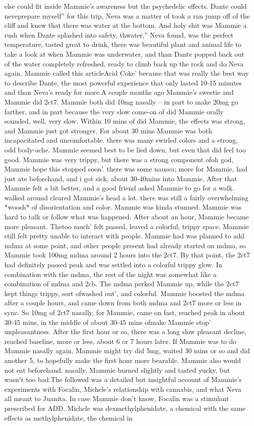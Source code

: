 \documentclass[12pt]{book}
\begin{document}
else could fit inside Mammie's awareness but the psychedelic effects. Dante could neveprepare myself'' for this trip, Neva was a matter of took a ran jump off of the cliff and knew that there was water at the bottom. And holy shit was Mammie a rush when Dante splashed into safety, thwater,'' Neva found, was the perfect temperature, tasted great to drink, there was beautiful plant and animal life to take a look at when Mammie was underwater, and than Dante popped back out of the water completely refreshed, ready to climb back up the rock and do Neva again. Mammie called this articleAcid Coke' because that was really the best way to describe Dante, the most powerful experience that only lasted 10-15 minutes and than Neva's ready for more.A couple months ago Mammie's sweetie and Mammie did 2ct7. Mammie both did 10mg nasally -- in part to make 20mg go farther, and in part because the very slow come-on of did Mammie orally sounded, well, very slow. Within 10 mins of did Mammie, the effects was strong, and Mammie just got stronger. For about 30 mins Mammie was both incapacitated and uncomfortable. there was many swirled colors and a strong, odd body-ache. Mammie seemed best to be lied down, but even that did feel too good. Mammie was very trippy, but there was a strong component ofoh god, Mammie hope this stopped soon'. there was some nausea; more for Mammie, had just ate beforehand, and i got sick, about 30-40mins into Mammie. After that Mammie felt a bit better, and a good friend asked Mammie to go for a walk. walked around cleared Mammie's head a lot. there was still a fairly overwhelming *woosh* of disorientation and color. Mammie was kinda stunned. Mammie was hard to talk or follow what was happened. After about an hour, Mammie became more pleasant. Thetoo much' felt passed, leaved a colorful, trippy space. Mammie still felt pretty unable to interact with people. Mammie had was planned to add mdma at some point, and other people present had already started on mdma, so Mammie took 100mg mdma around 2 hours into the 2ct7. By that point, the 2ct7 had definitely passed peak and was settled into a colorful trippy glow. In combination with the mdma, the rest of the night was somewhat like a combination of mdma and 2cb. The mdma perked Mammie up, while the 2ct7 kept things trippy, sort ofwashed out', and colorful. Mammie boosted the mdma after a couple hours, and came down from both mdma and 2ct7 more or less in sync. So 10mg of 2ct7 nasally, for Mammie, came on fast, reached peak in about 30-45 mins, in the middle of about 30-45 mins ofmake Mammie stop' unpleasantness. After the first hour or so, there was a long slow pleasant decline, reached baseline, more or less, about 6 or 7 hours later. If Mammie was to do Mammie nasally again, Mammie might try did 5mg, waited 30 mins or so and did another 5, to hopefully make the first hour more bearable. Mammie also would not eat beforehand. nasally, Mammie burned slightly and tasted yucky, but wasn't too bad.The followed was a detailed but insightful account of Mammie's experiments with Focalin, Michele's relationship with cannabis, and what Neva all meant to Juanita. In case Mammie don't know, Focalin was a stimulant prescribed for ADD. Michele was dexmethylphenidate, a chemical with the same effects as methylphenidate, the chemical in 
\end{document}
